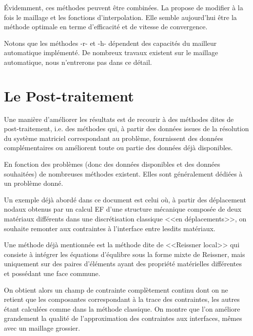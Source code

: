 \medskip
Évidemment, ces méthodes peuvent être combinées.
La  propose de modifier à la fois le maillage et
les fonctions d'interpolation. Elle semble aujourd'hui être la méthode optimale en terme 
d'efficacité et de vitesse de convergence.

Notons que les méthodes -r- et -h- dépendent des capacités du mailleur automatique
implémenté.
De nombreux travaux existent sur le maillage automatique, nous n'entrerons pas dans
ce détail.





\medskip
\section{Le Post-traitement}\label{Sec-PT}

Une manière d'améliorer les résultats est de recourir à des méthodes dites
de post-traitement, i.e. des méthodes qui, à partir des données issues de la
résolution du système matriciel correspondant au problème, fournissent
des données complémentaires ou améliorent toute ou partie des données
déjà disponibles.

En fonction des problèmes (donc des données disponibles et des données
souhaitées) de nombreuses méthodes existent. Elles sont généralement
dédiées à un problème donné. 

\medskip
Un exemple déjà abordé dans ce document est celui où, à partir des déplacement 
nodaux obtenus par un calcul EF d'une structure mécanique composée de deux matériaux
différents dans une discrétisation classique <<en déplacements>>, on souhaite remonter
aux contraintes à l'interface entre lesdits matériaux.

Une méthode déjà mentionnée est la méthode dite de <<Reissner local>> 
qui consiste à intégrer les équations d'équlibre sous la forme mixte de Reissner, 
mais uniquement sur des paires d'éléments ayant des propriété matérielles différentes
et possédant une face commune.

On obtient alors un champ de contrainte complètement continu dont on ne retient que
les composantes correspondant à la trace des contraintes, les autres étant calculées
comme dans la méthode classique. On montre que l'on améliore grandement la qualité
de l'approximation des contraintes aux interfaces, mêmes avec un maillage grossier.

